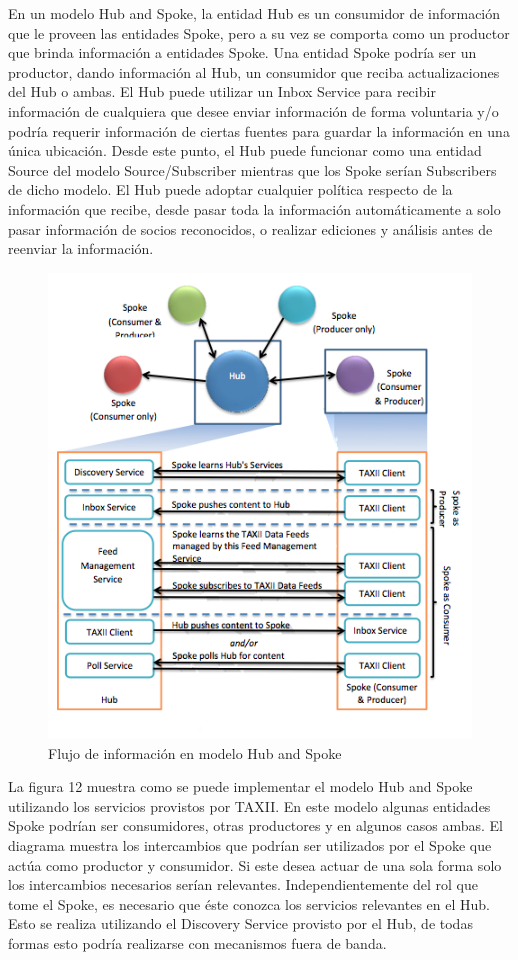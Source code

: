 En un modelo Hub and Spoke, la entidad Hub es un consumidor de 
información que le proveen las entidades Spoke, pero a su vez se comporta como
un productor que brinda información a entidades 
Spoke. Una entidad Spoke podría ser un productor, dando información al Hub, un 
consumidor que reciba actualizaciones del Hub o ambas. El Hub puede utilizar un 
Inbox Service para recibir información de cualquiera que desee enviar 
información de forma voluntaria y/o podría requerir información de ciertas 
fuentes para guardar la información en una única ubicación. Desde este punto, el 
Hub puede funcionar como una entidad Source del modelo Source/Subscriber 
mientras que los Spoke serían Subscribers de dicho modelo. El Hub puede adoptar 
cualquier política respecto de la información que recibe, desde pasar toda la 
información automáticamente a solo pasar información de socios reconocidos, o 
realizar ediciones y análisis antes de reenviar la información.

\begin{figure}[ht!]
  \centering
    \includegraphics[scale=0.75]{./images/HubAndSpokeModel.png}
    \caption{Flujo de información en modelo Hub and Spoke \protect\cite{b1}}
\end{figure}

La figura 12 muestra como se puede implementar el modelo Hub and Spoke 
utilizando los servicios provistos por TAXII. En este modelo algunas entidades 
Spoke podrían ser consumidores, otras productores y en algunos casos ambas. El 
diagrama muestra los intercambios que podrían ser utilizados por el Spoke que 
actúa como productor y consumidor. Si este desea actuar de una sola forma solo 
los intercambios necesarios serían relevantes. Independientemente del rol que 
tome el Spoke, es necesario que éste conozca los servicios relevantes en el Hub. 
Esto se realiza utilizando el Discovery Service provisto por el Hub, de todas 
formas esto podría realizarse con mecanismos fuera de banda.



